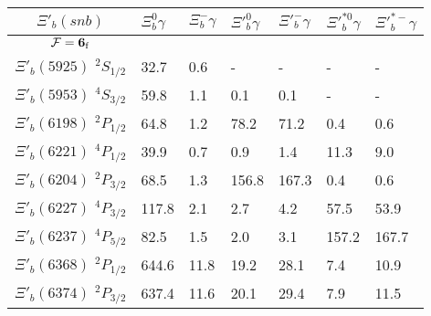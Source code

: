 \begin{tabular}{c |  p{0.65cm}  p{0.65cm}  p{0.65cm}  p{0.65cm}  p{0.65cm}  p{0.65cm}} \hline \hline
$\Xi'_b(snb)$  & $\Xi_{b}^{0} \gamma$  & $\Xi_{b}^{-} \gamma$  & $\Xi'^{0}_{b} \gamma$  & $\Xi'^{-}_{b} \gamma$  & $\Xi'^{*0}_{b} \gamma$  & $\Xi'^{*-}_{b} \gamma$  \\ \hline
$\mathcal{F}={\bf {6}}_{\rm f}$ &&&&&&\\ \hline
$\Xi'_b(5925)$ $^{2}S_{1/2}$&32.7  &0.6  &-  &-  &-  &- \\
$\Xi'_b(5953)$ $^{4}S_{3/2}$&59.8  &1.1  &0.1  &0.1  &-  &- \\
$\Xi'_b(6198)$ $^{2}P_{1/2}$&64.8  &1.2  &78.2  &71.2  &0.4  &0.6 \\
$\Xi'_b(6221)$ $^{4}P_{1/2}$&39.9  &0.7  &0.9  &1.4  &11.3  &9.0 \\
$\Xi'_b(6204)$ $^{2}P_{3/2}$&68.5  &1.3  &156.8  &167.3  &0.4  &0.6 \\
$\Xi'_b(6227)$ $^{4}P_{3/2}$&117.8  &2.1  &2.7  &4.2  &57.5  &53.9 \\
$\Xi'_b(6237)$ $^{4}P_{5/2}$&82.5  &1.5  &2.0  &3.1  &157.2  &167.7 \\
$\Xi'_b(6368)$ $^{2}P_{1/2}$&644.6  &11.8  &19.2  &28.1  &7.4  &10.9 \\
$\Xi'_b(6374)$ $^{2}P_{3/2}$&637.4  &11.6  &20.1  &29.4  &7.9  &11.5 \\
\hline \hline
\end{tabular}
